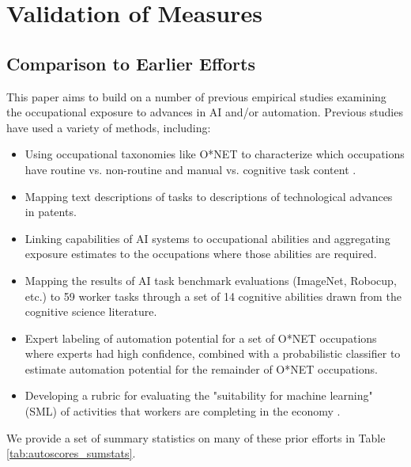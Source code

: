 \documentclass[11pt]{article}
\begin{document}




\section{Validation of Measures}
\label{sec:validation}

\subsection{Comparison to Earlier Efforts}
\label{subsec:othermeasures}
This paper aims to build on a number of previous empirical studies examining the occupational exposure to advances in AI and/or automation. Previous studies have used a variety of methods, including:
\begin{itemize}
    \item Using occupational taxonomies like O*NET to characterize which occupations have routine vs. non-routine and manual vs. cognitive task content \citep{autor2003skill, acemoglu2011skills}.
    \item Mapping text descriptions of tasks to descriptions of technological advances in patents. \citep{NBERw29552, Webb2020}
    \item Linking capabilities of AI systems to occupational abilities and aggregating exposure estimates to the occupations where those abilities are required. \citep{SeamansRajFelten2018, felten2023will}
    \item Mapping the results of AI task benchmark evaluations (ImageNet, Robocup, etc.) to 59 worker tasks through a set of 14 cognitive abilities drawn from the cognitive science literature. \citep{Tolan2021}
    \item Expert labeling of automation potential for a set of O*NET occupations where experts had high confidence, combined with a probabilistic classifier to estimate automation potential for the remainder of O*NET occupations. \citep{FreyOsborne2017}
    \item Developing a rubric for evaluating the "suitability for machine learning" (SML) of activities that workers are completing in the economy \citep{brynjolfsson2017can,Brynjolfsson2018, brynjolfssonQuantifyingDistributionMachine2023}. 
\end{itemize}

We provide a set of summary statistics on many of these prior efforts in Table \ref{tab:autoscores_sumstats}. 
\end{document}
